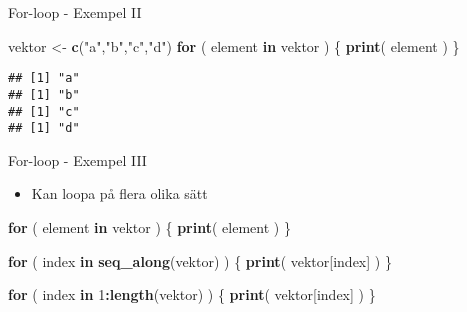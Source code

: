 \documentclass[
  11pt,
  ignorenonframetext,
]{beamer}
\newenvironment{Shaded}{\begin{snugshade}}{\end{snugshade}}
\newcommand{\ControlFlowTok}[1]{\textcolor[rgb]{0.13,0.29,0.53}{\textbf{#1}}}
\newcommand{\DecValTok}[1]{\textcolor[rgb]{0.00,0.00,0.81}{#1}}
\newcommand{\FunctionTok}[1]{\textcolor[rgb]{0.13,0.29,0.53}{\textbf{#1}}}
\newcommand{\NormalTok}[1]{#1}
\newcommand{\OtherTok}[1]{\textcolor[rgb]{0.56,0.35,0.01}{#1}}
\newcommand{\SpecialCharTok}[1]{\textcolor[rgb]{0.81,0.36,0.00}{\textbf{#1}}}
\newcommand{\StringTok}[1]{\textcolor[rgb]{0.31,0.60,0.02}{#1}}
\providecommand{\tightlist}{%
  \setlength{\itemsep}{0pt}\setlength{\parskip}{0pt}}
\begin{document}
\begin{frame}[fragile]{For-loop - Exempel II}
\label{for-loop---exempel-ii}
\begin{Shaded}
\begin{Highlighting}[]
\NormalTok{vektor }\OtherTok{\textless{}{-}} \FunctionTok{c}\NormalTok{(}\StringTok{"a"}\NormalTok{,}\StringTok{"b"}\NormalTok{,}\StringTok{"c"}\NormalTok{,}\StringTok{"d"}\NormalTok{)}
\ControlFlowTok{for}\NormalTok{ ( element }\ControlFlowTok{in}\NormalTok{ vektor ) \{}
  \FunctionTok{print}\NormalTok{( element )}
\NormalTok{\}}
\end{Highlighting}
\end{Shaded}

\pause

\begin{verbatim}
## [1] "a"
## [1] "b"
## [1] "c"
## [1] "d"
\end{verbatim}
\end{frame}

\begin{frame}[fragile]{For-loop - Exempel III}
\label{for-loop---exempel-iii}
\begin{itemize}
\tightlist
\item
  Kan loopa på flera olika sätt
\end{itemize}

\begin{Shaded}
\begin{Highlighting}[]
\ControlFlowTok{for}\NormalTok{ ( element }\ControlFlowTok{in}\NormalTok{ vektor ) \{}
  \FunctionTok{print}\NormalTok{( element )}
\NormalTok{\}}
\end{Highlighting}
\end{Shaded}

\begin{Shaded}
\begin{Highlighting}[]
\ControlFlowTok{for}\NormalTok{ ( index }\ControlFlowTok{in} \FunctionTok{seq\_along}\NormalTok{(vektor) ) \{}
  \FunctionTok{print}\NormalTok{( vektor[index] )}
\NormalTok{\}}
\end{Highlighting}
\end{Shaded}

\begin{Shaded}
\begin{Highlighting}[]
\ControlFlowTok{for}\NormalTok{ ( index }\ControlFlowTok{in} \DecValTok{1}\SpecialCharTok{:}\FunctionTok{length}\NormalTok{(vektor) ) \{}
  \FunctionTok{print}\NormalTok{( vektor[index] )}
\NormalTok{\}}
\end{Highlighting}
\end{Shaded}
\end{frame}
\end{document}
